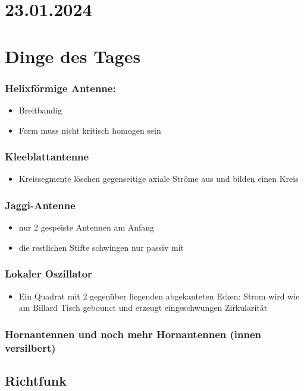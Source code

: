 \documentclass[a4paper]{article}
\begin{document}
\section*{23.01.2024}
\section*{Dinge des Tages}
\subsubsection*{Helixförmige Antenne:} 
\begin{itemize}
    \item Breitbandig
    \item Form muss nicht kritisch homogen sein
\end{itemize}
\subsubsection*{Kleeblattantenne}
\begin{itemize}
    \item Kreissegmente löschen gegenseitige axiale Ströme aus und bilden einen
        Kreis
\end{itemize}
\subsubsection*{Jaggi-Antenne}
\begin{itemize}
    \item nur 2 gespeiste Antennen am Anfang
    \item die restlichen Stifte schwingen nur passiv mit
\end{itemize}
\subsubsection*{Lokaler Oszillator}
\begin{itemize}
    \item Ein Quadrat mit 2 gegenüber liegenden abgekanteten Ecken: Strom wird
        wie am Billard Tisch gebounct und erzeugt eingeschwungen Zirkularität
\end{itemize}
\subsubsection*{Hornantennen und noch mehr Hornantennen (innen versilbert)}

\subsection*{Richtfunk}
\end{document}
